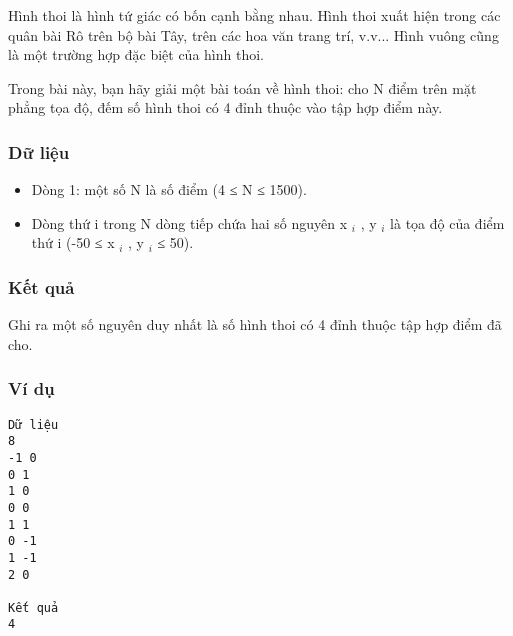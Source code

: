 



   Hình thoi là hình tứ giác có bốn cạnh bằng nhau. Hình thoi   xuất hiện trong các quân bài Rô trên bộ bài Tây, trên các hoa   văn trang trí, v.v... Hình vuông cũng là một trường hợp đặc biệt của hình thoi.  

   Trong bài này, bạn hãy giải một bài toán về hình thoi: cho   N điểm trên mặt phẳng tọa độ, đếm số hình thoi có 4 đỉnh   thuộc vào tập hợp điểm này.  

\subsubsection{   Dữ liệu  }
\begin{itemize}
	\item     Dòng 1: một số N là số điểm (4 ≤ N ≤ 1500).   
	\item     Dòng thứ i trong N dòng tiếp chứa hai số nguyên   x    $_     i    $    , y    $_     i    $    là tọa độ của điểm thứ i (-50   ≤ x    $_     i    $    , y    $_     i    $    ≤ 50).   
\end{itemize}

\subsubsection{   Kết quả  }

   Ghi ra một số nguyên duy nhất là số hình thoi có 4 đỉnh   thuộc tập hợp điểm đã cho.  

\subsubsection{   Ví dụ  }
\begin{verbatim}
Dữ liệu
8
-1 0
0 1
1 0
0 0
1 1
0 -1
1 -1
2 0

Kết quả
4
\end{verbatim}